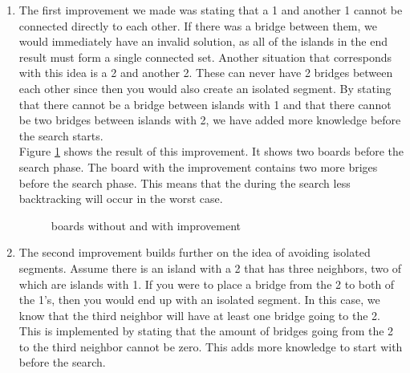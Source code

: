 \documentclass{report}
\begin{document}
\begin{enumerate}
	\item The first improvement we made was stating that a 1 and another 1 cannot be connected directly to each other. If there was a bridge between them, we would immediately have an invalid solution, as all of the islands in the end result must form a single connected set. Another situation that corresponds with this idea is a 2 and another 2. These can never have 2 bridges between each other since then you would also create an isolated segment. By stating that there cannot be a bridge between islands with 1 and that there cannot be two bridges between islands with 2, we have added more knowledge before the search starts. \\
	Figure \ref{fig:classic_heuristic} shows the result of this improvement. It shows two boards before the search phase. The board with the improvement contains two more briges before the search phase. This means that the during the search less backtracking will occur in the worst case.
	\begin{figure}[h]
        \centering
        \qquad
        \caption{boards without and with improvement}%
        \label{fig:classic_heuristic}%
    \end{figure}

	\item The second improvement builds further on the idea of avoiding isolated segments.
	Assume there is an island with a 2 that has three neighbors, two of which are islands with 1. If you were to place a bridge from the 2 to both of the 1's, then you would end up with an isolated segment. In this case, we know that the third neighbor will have at least one bridge going to the 2. This is implemented by stating that the amount of bridges going from the 2 to the third neighbor cannot be zero. This adds more knowledge to start with before the search.


\end{enumerate}
\end{document}
